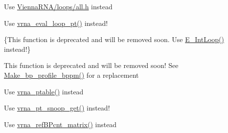 \begin{DoxyRefList}
\item[\label{deprecated__deprecated000088}%
\Hypertarget{deprecated__deprecated000088}%
File \hyperlink{loop__energies_8h}{loop\+\_\+energies.h} ]Use \hyperlink{all_8h}{Vienna\+R\+N\+A/loops/all.\+h} instead  
\item[\label{deprecated__deprecated000057}%
\Hypertarget{deprecated__deprecated000057}%
Global \hyperlink{group__eval__deprecated_ga507d4fd93f4b398d793ba2402731388d}{loop\+\_\+energy} (short $\ast$ptable, short $\ast$s, short $\ast$s1, int i)]Use \hyperlink{group__eval__loops_ga730ba4df55c02fd530a0cddd49faf760}{vrna\+\_\+eval\+\_\+loop\+\_\+pt()} instead! 
\item[\label{deprecated__deprecated000076}%
\Hypertarget{deprecated__deprecated000076}%
Global \hyperlink{group__mfe__global__deprecated_ga2163034a25c6115d894b199e97e03f6c}{Loop\+Energy} (int n1, int n2, int type, int type\+\_\+2, int si1, int sj1, int sp1, int sq1)]\{This function is deprecated and will be removed soon. Use \hyperlink{group__eval__deprecated_gaafbc187b7f78e8e82afb77dd6f3b8fc5}{E\+\_\+\+Int\+Loop()} instead!\}  
\item[\label{deprecated__deprecated000123}%
\Hypertarget{deprecated__deprecated000123}%
Global \hyperlink{profiledist_8h_a904c7eaf4a2413567c00ac4891749d18}{Make\+\_\+bp\+\_\+profile} (int length)]This function is deprecated and will be removed soon! See \hyperlink{profiledist_8h_a3dff26e707a2a2e65a0f759caabde6e7}{Make\+\_\+bp\+\_\+profile\+\_\+bppm()} for a replacement 
\item[\label{deprecated__deprecated000185}%
\Hypertarget{deprecated__deprecated000185}%
Global \hyperlink{group__struct__utils__deprecated_ga89c32307ee50a0026f4a3131fac0845a}{make\+\_\+pair\+\_\+table} (const char $\ast$structure)]Use \hyperlink{group__struct__utils__pair__table_gae829fb8bb7f694c12a9c0bbc34c77c60}{vrna\+\_\+ptable()} instead


\item[\label{deprecated__deprecated000188}%
\Hypertarget{deprecated__deprecated000188}%
Global \hyperlink{group__struct__utils__deprecated_ga9aa3bf3b4346bb7fb88efc154dd07a79}{make\+\_\+pair\+\_\+table\+\_\+snoop} (const char $\ast$structure)]Use \hyperlink{group__struct__utils__pair__table_gaef0f7e1a6c00c81a349973de53039dda}{vrna\+\_\+pt\+\_\+snoop\+\_\+get()} instead!


\item[\label{deprecated__deprecated000190}%
\Hypertarget{deprecated__deprecated000190}%
Global \hyperlink{group__struct__utils__deprecated_ga578cd9712dee812fb1c58aa3cc489864}{make\+\_\+reference\+B\+P\+\_\+array} (short $\ast$reference\+\_\+pt, unsigned int turn)]Use \hyperlink{group__struct__utils_gab4c2a00c99ce1d612ffa5bde114eb96d}{vrna\+\_\+ref\+B\+Pcnt\+\_\+matrix()} instead



\end{DoxyRefList}
